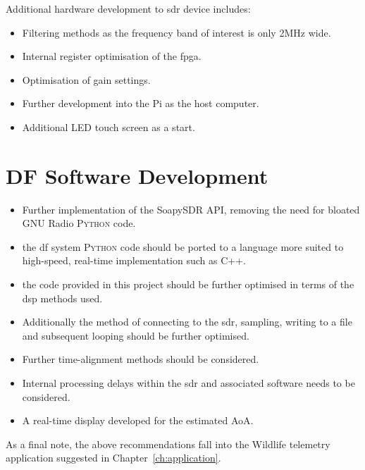 \documentclass[class=report,11pt,crop=false]{standalone}
\begin{document}
\newpage
Additional hardware development to \gls{sdr} device includes:
\begin{itemize}
    \item Filtering methods as the frequency band of interest is only 2MHz wide.
    \item Internal register optimisation of the \gls{fpga}.
    \item Optimisation of gain settings.
    \item Further development into the Pi as the host computer. 
    \item Additional LED touch screen as a start. 
\end{itemize}

\section{DF Software Development}
\begin{itemize}
    \item Further implementation of the SoapySDR \gls{API}, removing the need for bloated GNU Radio \textsc{Python} code. 
    \item the \gls{df} system \textsc{Python} code should be ported to a language more suited to high-speed, real-time implementation such as C++. 
    \item the code provided in this project should be further optimised in terms of the \gls{dsp} methods used. 
    \item Additionally the method of connecting to the \gls{sdr}, sampling, writing to a file and subsequent looping should be further optimised.
    \item Further time-alignment methods should be considered.
    \item Internal processing delays within the \gls{sdr} and associated software needs to be considered. 
    \item A real-time display developed for the estimated \gls{AoA}.
\end{itemize}


As a final note, the above recommendations fall into the Wildlife telemetry application suggested in Chapter~\ref{ch:application}.

\ifstandalone

\printnoidxglossary[type=\acronymtype,nonumberlist]
\fi
\end{document}
